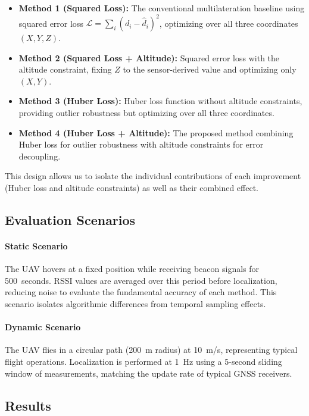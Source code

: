 \documentclass[master,final,11pt]{iscs-thesis}
\begin{document}
\begin{itemize}
    \item \textbf{Method 1 (Squared Loss):} The conventional multilateration baseline using squared error loss $\mathcal{L} = \sum_i (d_i - \hat{d}_i)^2$, optimizing over all three coordinates $(X, Y, Z)$.
    
    \item \textbf{Method 2 (Squared Loss + Altitude):} Squared error loss with the altitude constraint, fixing $Z$ to the sensor-derived value and optimizing only $(X, Y)$.
    
    \item \textbf{Method 3 (Huber Loss):} Huber loss function without altitude constraints, providing outlier robustness but optimizing over all three coordinates.
    
    \item \textbf{Method 4 (Huber Loss + Altitude):} The proposed method combining Huber loss for outlier robustness with altitude constraints for error decoupling.
\end{itemize}

This design allows us to isolate the individual contributions of each improvement (Huber loss and altitude constraints) as well as their combined effect.

\subsection{Evaluation Scenarios}

\paragraph{Static Scenario}
The UAV hovers at a fixed position while receiving beacon signals for 500~seconds.
RSSI values are averaged over this period before localization, reducing noise to evaluate the fundamental accuracy of each method.
This scenario isolates algorithmic differences from temporal sampling effects.

\paragraph{Dynamic Scenario}
The UAV flies in a circular path (200~m radius) at 10~m/s, representing typical flight operations.
Localization is performed at 1~Hz using a 5-second sliding window of measurements, matching the update rate of typical GNSS receivers.

\subsection{Results}
\end{document}
